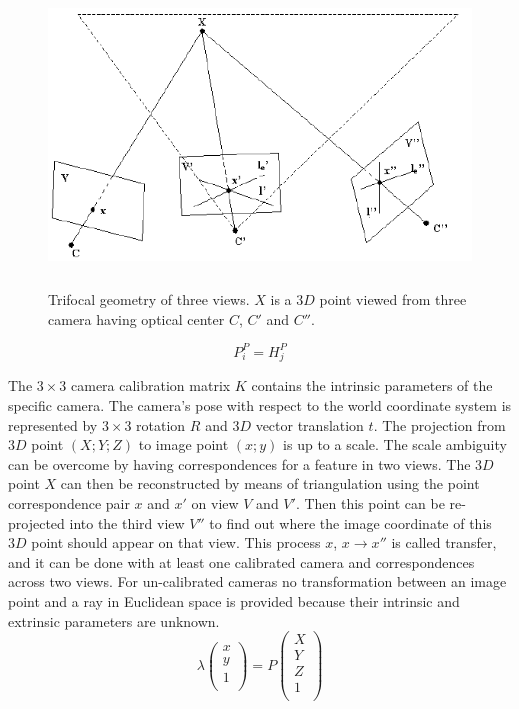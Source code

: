 \begin{figure}[t]
\centering
\includegraphics[width=12.5cm,height=8cm]{figures/trifocal_tensor_01.png}
\caption{Trifocal geometry of three views. $X$ is a $3D$ point viewed from three camera having optical center $C$, $C'$ and $C''$.}
\label{fig_trifocal_tensor}
\end{figure}

\begin{equation}
	P^P_i = H^P_j
\label{eq_projective_transformation}
\end{equation}


The $3 \times 3$ camera calibration matrix $K$ contains the intrinsic parameters of the specific camera. The camera's pose with
respect to the world coordinate system is represented by $3 \times 3$ rotation $R$ and $3D$ vector translation $t$. The projection from $3D$ point $(X;Y;Z)$ to image point $(x;y)$ is up to a scale. The scale ambiguity can be overcome by having correspondences for a feature in two views. The $3D$ point $X$ can then be reconstructed by means of triangulation using the point correspondence pair $x$ and $x'$ on view $V$ and $V'$. Then this point can
be re-projected into the third view $V''$ to find out where the image coordinate of this $3D$ point should appear on that view. This process $x$, $x \rightarrow x''$ is called transfer, and it can be done with at least one calibrated camera and correspondences across two views. For un-calibrated cameras no transformation between an image point and a ray in Euclidean space is provided because their intrinsic and extrinsic parameters are unknown.
\begin{equation}
 \lambda  \begin{pmatrix}
    	x \\
    	y \\
    	1 \\
    \end{pmatrix}
    = 
    P \begin{pmatrix}
   		X \\
   		Y \\
   		Z \\
   		1 \\
    \end{pmatrix}
\label{eq_camera_world_point}
\end{equation}

